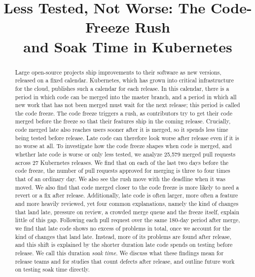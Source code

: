 \documentclass[10pt,conference]{IEEEtran}
\begin{document}
\title{Less Tested, Not Worse: The Code-Freeze Rush\\and Soak Time in Kubernetes}

\author{}

\maketitle

\begin{abstract}
Large open-source projects ship improvements to their software as new versions, released on a fixed calendar. Kubernetes, which has grown into critical infrastructure for the cloud, publishes such a calendar for each release. In this calendar, there is a period in which code can be merged into the master branch, and a period in which all new work that has not been merged must wait for the next release; this period is called the code freeze. The code freeze triggers a rush, as contributors try to get their code merged before the freeze so that their features ship in the coming release. Crucially, code merged late also reaches users sooner after it is merged, so it spends less time being tested before release. Late code can therefore look worse after release even if it is no worse at all. To investigate how the code freeze shapes when code is merged, and whether late code is worse or only less tested, we analyze 25,579 merged pull requests across 27 Kubernetes releases. We find that on each of the last two days before the code freeze, the number of pull requests approved for merging is three to four times that of an ordinary day. We also see the rush move with the deadline when it was moved. We also find that code merged closer to the code freeze is more likely to need a revert or a fix after release. Additionally, late code is often larger, more often a feature and more heavily reviewed, yet four common explanations, namely the kind of changes that land late, pressure on review, a crowded merge queue and the freeze itself, explain little of this gap. Following each pull request over the same 180-day period after merge, we find that late code shows no excess of problems in total, once we account for the kind of changes that land late. Instead, more of its problems are found after release, and this shift is explained by the shorter duration late code spends on testing before release. We call this duration \emph{soak time}. We discuss what these findings mean for release teams and for studies that count defects after release, and outline future work on testing soak time directly.
\end{abstract}
\end{document}
